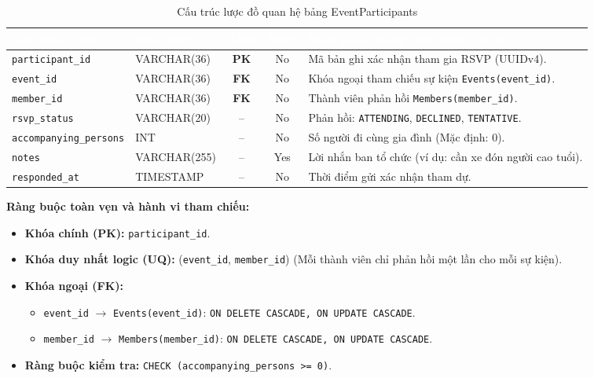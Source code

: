 \begin{table}[H]
    \centering
    \small
    \renewcommand{\arraystretch}{1.2}
    \begin{tabularx}{\textwidth}{p{3.8cm} p{2.4cm} c c X}
        \toprule
        \rowcolor{tableheader}\textcolor{white}{\textbf{Tên thuộc tính}} & \textcolor{white}{\textbf{Kiểu logic}} & \textcolor{white}{\textbf{Khóa}} & \textcolor{white}{\textbf{Null?}} & \textcolor{white}{\textbf{Diễn giải \& Ràng buộc tham chiếu}} \\
        \midrule
        \rowcolor{tablerowalt}
        \texttt{participant\_id} & VARCHAR(36) & \textcolor{pkcolor}{\textbf{PK}} & No & Mã bản ghi xác nhận tham gia RSVP (UUIDv4). \\
        \texttt{event\_id} & VARCHAR(36) & \textcolor{fkcolor}{\textbf{FK}} & No & Khóa ngoại tham chiếu sự kiện \texttt{Events(event\_id)}. \\
        \rowcolor{tablerowalt}
        \texttt{member\_id} & VARCHAR(36) & \textcolor{fkcolor}{\textbf{FK}} & No & Thành viên phản hồi \texttt{Members(member\_id)}. \\
        \texttt{rsvp\_status} & VARCHAR(20) & -- & No & Phản hồi: \texttt{ATTENDING}, \texttt{DECLINED}, \texttt{TENTATIVE}. \\
        \rowcolor{tablerowalt}
        \texttt{accompanying\_persons} & INT & -- & No & Số người đi cùng gia đình (Mặc định: 0). \\
        \texttt{notes} & VARCHAR(255) & -- & Yes & Lời nhắn ban tổ chức (ví dụ: cần xe đón người cao tuổi). \\
        \rowcolor{tablerowalt}
        \texttt{responded\_at} & TIMESTAMP & -- & No & Thời điểm gửi xác nhận tham dự. \\
        \bottomrule
    \end{tabularx}
    \caption{Cấu trúc lược đồ quan hệ bảng EventParticipants}
    \label{tab:schema_event_participants}
\end{table}

\noindent\textbf{Ràng buộc toàn vẹn và hành vi tham chiếu:}
\begin{itemize}[noitemsep,topsep=2pt]
    \item \textbf{Khóa chính (PK):} \texttt{participant\_id}.
    \item \textbf{Khóa duy nhất logic (UQ):} (\texttt{event\_id}, \texttt{member\_id}) (Mỗi thành viên chỉ phản hồi một lần cho mỗi sự kiện).
    \item \textbf{Khóa ngoại (FK):}
    \begin{itemize}[noitemsep]
        \item \texttt{event\_id} $\rightarrow$ \texttt{Events(event\_id)}: \texttt{ON DELETE CASCADE, ON UPDATE CASCADE}.
        \item \texttt{member\_id} $\rightarrow$ \texttt{Members(member\_id)}: \texttt{ON DELETE CASCADE, ON UPDATE CASCADE}.
    \end{itemize}
    \item \textbf{Ràng buộc kiểm tra:} \texttt{CHECK (accompanying\_persons >= 0)}.
\end{itemize}

